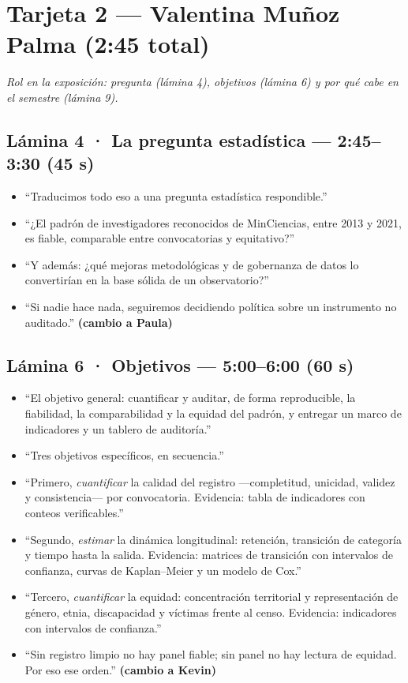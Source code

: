 \documentclass[10pt,a4paper]{article}
\newcommand{\tiempo}[1]{\textbf{\color{accent}#1}}
\begin{document}
\newpage
\section{Tarjeta 2 — Valentina Muñoz Palma \quad (2:45 total)}

\textit{Rol en la exposición: pregunta (lámina 4), objetivos (lámina 6) y
por qué cabe en el semestre (lámina 9).}

\subsection{Lámina 4 · La pregunta estadística — 2:45--3:30 (45 s)}
\begin{itemize}
  \item ``Traducimos todo eso a una pregunta estadística respondible.''
  \item ``¿El padrón de investigadores reconocidos de MinCiencias, entre 2013
        y 2021, es fiable, comparable entre convocatorias y equitativo?''
  \item ``Y además: ¿qué mejoras metodológicas y de gobernanza de datos lo
        convertirían en la base sólida de un observatorio?''
  \item ``Si nadie hace nada, seguiremos decidiendo política sobre un
        instrumento no auditado.'' \hfill \tiempo{(cambio a Paula)}
\end{itemize}

\subsection{Lámina 6 · Objetivos — 5:00--6:00 (60 s)}
\begin{itemize}
  \item ``El objetivo general: cuantificar y auditar, de forma reproducible,
        la fiabilidad, la comparabilidad y la equidad del padrón, y entregar un
        marco de indicadores y un tablero de auditoría.''
  \item ``Tres objetivos específicos, en secuencia.''
  \item ``Primero, \emph{cuantificar} la calidad del registro —completitud,
        unicidad, validez y consistencia— por convocatoria. Evidencia: tabla de
        indicadores con conteos verificables.''
  \item ``Segundo, \emph{estimar} la dinámica longitudinal: retención,
        transición de categoría y tiempo hasta la salida. Evidencia: matrices
        de transición con intervalos de confianza, curvas de Kaplan--Meier y un
        modelo de Cox.''
  \item ``Tercero, \emph{cuantificar} la equidad: concentración territorial y
        representación de género, etnia, discapacidad y víctimas frente al
        censo. Evidencia: indicadores con intervalos de confianza.''
  \item ``Sin registro limpio no hay panel fiable; sin panel no hay lectura de
        equidad. Por eso ese orden.'' \hfill \tiempo{(cambio a Kevin)}
\end{itemize}
\end{document}
